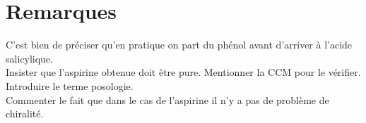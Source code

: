 \documentclass[12pt,prb,aps,epsf]{article}
\begin{document}
\section*{Remarques}
C'est bien de préciser qu'en pratique on part du phénol avant d'arriver à l'acide salicylique.\\

Insister que l'aspirine obtenue doit être pure. Mentionner la CCM pour le vérifier.\\

Introduire le terme posologie.\\

Commenter le fait que dans le cas de l'aspirine il n'y a pas de problème de chiralité.\\



	
\end{document}
